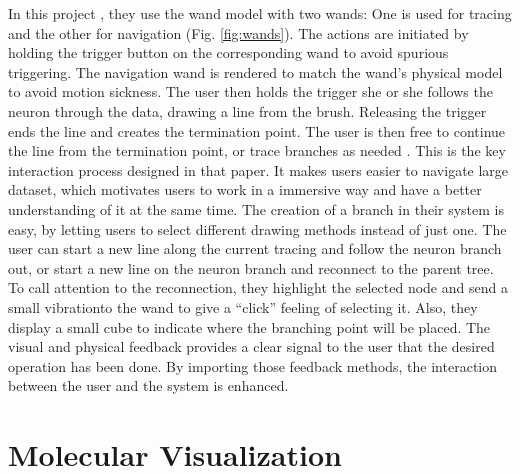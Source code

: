 \documentclass[10pt,twocolumn,letterpaper]{article}
\begin{document}
In this project \cite{Usher2018} , they use the wand model with two wands: One is used for tracing and the other for navigation (Fig. \ref{fig:wands}). The actions are initiated by holding the trigger button on the corresponding wand to avoid spurious triggering. The navigation wand is rendered to match the wand’s physical model to avoid motion sickness. The user then holds the trigger she or she follows the neuron through the data, drawing a line from the brush. Releasing the trigger ends the line and creates the termination point. The user is then free to continue the line from the termination point, or trace branches as needed \cite{Usher2018}. This is the key interaction process designed in that paper. It makes users easier to navigate large dataset, which motivates users to work in a immersive way and have a better understanding of it at the same time. The creation of a branch in their system is easy, by letting users to select different drawing methods instead of just one. The user can start a new line along the current tracing and follow the neuron branch out, or start a new line on the neuron branch and reconnect to the parent tree. To call attention to the reconnection, they highlight the selected node and send a small vibrationto the wand to give a “click” feeling of selecting it. Also, they display a small cube to indicate where the branching point will be placed. The visual and physical feedback provides a clear signal to the user that the desired operation has been done. By importing those feedback methods, the interaction between the user and the system is enhanced.
\section{Molecular Visualization}
\end{document}
